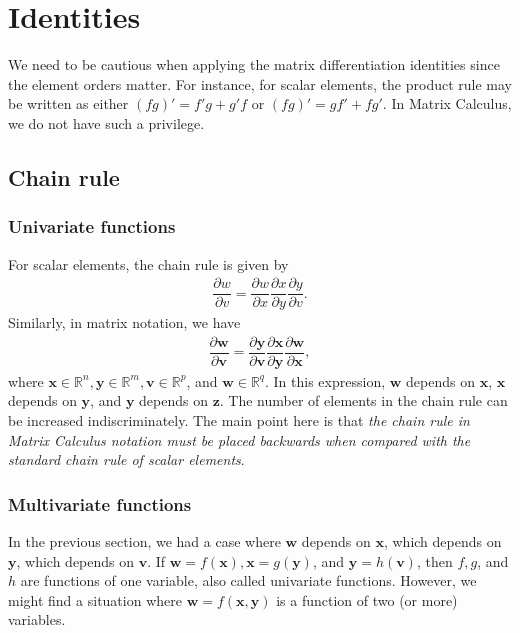 \section{Identities}
\label{sec:identities}

We need to be cautious when applying the matrix differentiation identities since the element orders matter. For instance, for scalar elements, the product rule may be written as either \((fg)' = f'g + g'f\) or \((fg)' = g f' + f g'\). In Matrix Calculus, we do not have such a privilege.

\subsection{Chain rule}
\subsubsection{Univariate functions}
For scalar elements, the chain rule is given by
\begin{align}
    \dfrac{\partial w}{\partial v} = \dfrac{\partial w}{\partial x} \dfrac{\partial x}{\partial y} \dfrac{\partial y}{\partial v}.
\end{align}
Similarly, in matrix notation, we have
\begin{align}
    \label{eq:chain-1inter}
    \dfrac{\partial \mathbf{w}}{\partial \mathbf{v}} = \dfrac{\partial \mathbf{y}}{\partial \mathbf{v}} \dfrac{\partial \mathbf{x}}{\partial \mathbf{y}} \dfrac{\partial \mathbf{w}}{\partial \mathbf{x}},
\end{align}
where \(\mathbf{x} \in \mathbb{R}^{n}, \mathbf{y} \in \mathbb{R}^{m}, \mathbf{v} \in \mathbb{R}^{p}\), and \(\mathbf{w} \in \mathbb{R}^q\). In this expression, \(\mathbf{w}\) depends on \(\mathbf{x}\), \(\mathbf{x}\) depends on \(\mathbf{y}\), and \(\mathbf{y}\) depends on \(\mathbf{z}\). The number of elements in the chain rule can be increased indiscriminately. The main point here is that \emph{the chain rule in Matrix Calculus notation must be placed backwards when compared with the standard chain rule of scalar elements}.

\subsubsection{Multivariate functions}

In the previous section, we had a case where \(\mathbf{w}\) depends on \(\mathbf{x}\), which depends on \(\mathbf{y}\), which depends on \(\mathbf{v}\). If \(\mathbf{w} = f(\mathbf{x}), \mathbf{x} = g(\mathbf{y})\), and \(\mathbf{y} = h(\mathbf{v})\), then \(f, g\), and \(h\) are functions of one variable, also called univariate functions. However, we might find a situation where \(\mathbf{w} = f(\mathbf{x}, \mathbf{y})\) is a function of two (or more) variables.

